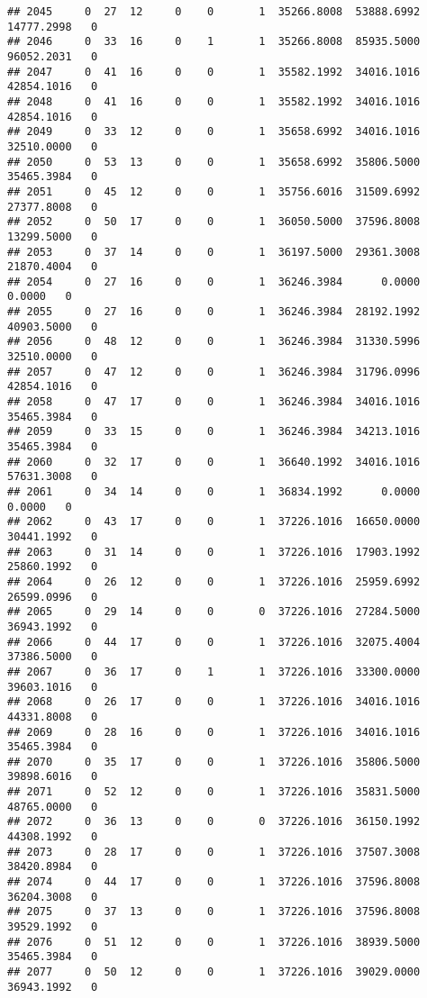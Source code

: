 \documentclass[
]{article}
\begin{document}
\begin{enumerate}
\begin{verbatim}
## 2045     0  27  12     0    0       1  35266.8008  53888.6992  14777.2998   0
## 2046     0  33  16     0    1       1  35266.8008  85935.5000  96052.2031   0
## 2047     0  41  16     0    0       1  35582.1992  34016.1016  42854.1016   0
## 2048     0  41  16     0    0       1  35582.1992  34016.1016  42854.1016   0
## 2049     0  33  12     0    0       1  35658.6992  34016.1016  32510.0000   0
## 2050     0  53  13     0    0       1  35658.6992  35806.5000  35465.3984   0
## 2051     0  45  12     0    0       1  35756.6016  31509.6992  27377.8008   0
## 2052     0  50  17     0    0       1  36050.5000  37596.8008  13299.5000   0
## 2053     0  37  14     0    0       1  36197.5000  29361.3008  21870.4004   0
## 2054     0  27  16     0    0       1  36246.3984      0.0000      0.0000   0
## 2055     0  27  16     0    0       1  36246.3984  28192.1992  40903.5000   0
## 2056     0  48  12     0    0       1  36246.3984  31330.5996  32510.0000   0
## 2057     0  47  12     0    0       1  36246.3984  31796.0996  42854.1016   0
## 2058     0  47  17     0    0       1  36246.3984  34016.1016  35465.3984   0
## 2059     0  33  15     0    0       1  36246.3984  34213.1016  35465.3984   0
## 2060     0  32  17     0    0       1  36640.1992  34016.1016  57631.3008   0
## 2061     0  34  14     0    0       1  36834.1992      0.0000      0.0000   0
## 2062     0  43  17     0    0       1  37226.1016  16650.0000  30441.1992   0
## 2063     0  31  14     0    0       1  37226.1016  17903.1992  25860.1992   0
## 2064     0  26  12     0    0       1  37226.1016  25959.6992  26599.0996   0
## 2065     0  29  14     0    0       0  37226.1016  27284.5000  36943.1992   0
## 2066     0  44  17     0    0       1  37226.1016  32075.4004  37386.5000   0
## 2067     0  36  17     0    1       1  37226.1016  33300.0000  39603.1016   0
## 2068     0  26  17     0    0       1  37226.1016  34016.1016  44331.8008   0
## 2069     0  28  16     0    0       1  37226.1016  34016.1016  35465.3984   0
## 2070     0  35  17     0    0       1  37226.1016  35806.5000  39898.6016   0
## 2071     0  52  12     0    0       1  37226.1016  35831.5000  48765.0000   0
## 2072     0  36  13     0    0       0  37226.1016  36150.1992  44308.1992   0
## 2073     0  28  17     0    0       1  37226.1016  37507.3008  38420.8984   0
## 2074     0  44  17     0    0       1  37226.1016  37596.8008  36204.3008   0
## 2075     0  37  13     0    0       1  37226.1016  37596.8008  39529.1992   0
## 2076     0  51  12     0    0       1  37226.1016  38939.5000  35465.3984   0
## 2077     0  50  12     0    0       1  37226.1016  39029.0000  36943.1992   0

\end{verbatim}
\end{enumerate}
\end{document}

